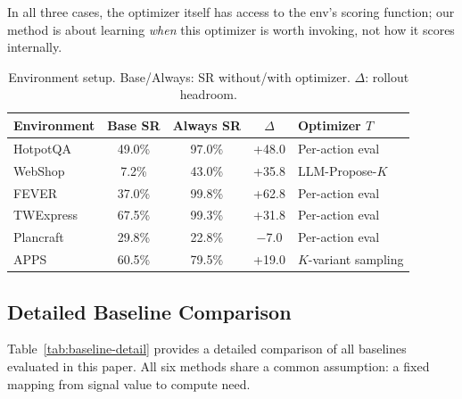 In all three cases, the optimizer itself has access to the env's
scoring function; our method is about learning \emph{when} this
optimizer is worth invoking, not how it scores internally.

\begin{table}[h!]
\caption{Environment setup. Base/Always: SR without/with optimizer.
$\Delta$: rollout headroom.}
\label{tab:env-setup}
\centering\small
\begin{tabular}{lcccl}
\toprule
Environment & Base SR & Always SR & $\Delta$ & Optimizer $T$ \\
\midrule
HotpotQA       & 49.0\% & 97.0\% & +48.0   & Per-action eval \\
WebShop        &  7.2\% & 43.0\% & +35.8   & LLM-Propose-$K$ \\
FEVER          & 37.0\% & 99.8\% & +62.8   & Per-action eval \\
TWExpress      & 67.5\% & 99.3\% & +31.8   & Per-action eval \\
Plancraft      & 29.8\% & 22.8\% & $-$7.0  & Per-action eval \\
APPS           & 60.5\% & 79.5\% & +19.0   & $K$-variant sampling \\
\bottomrule
\end{tabular}
\end{table}

\subsection{Detailed Baseline Comparison}
\label{app:method-comparison}

Table~\ref{tab:baseline-detail} provides a detailed comparison of
all baselines evaluated in this paper. All six methods share a
common assumption: a fixed mapping from signal value to compute
need.

